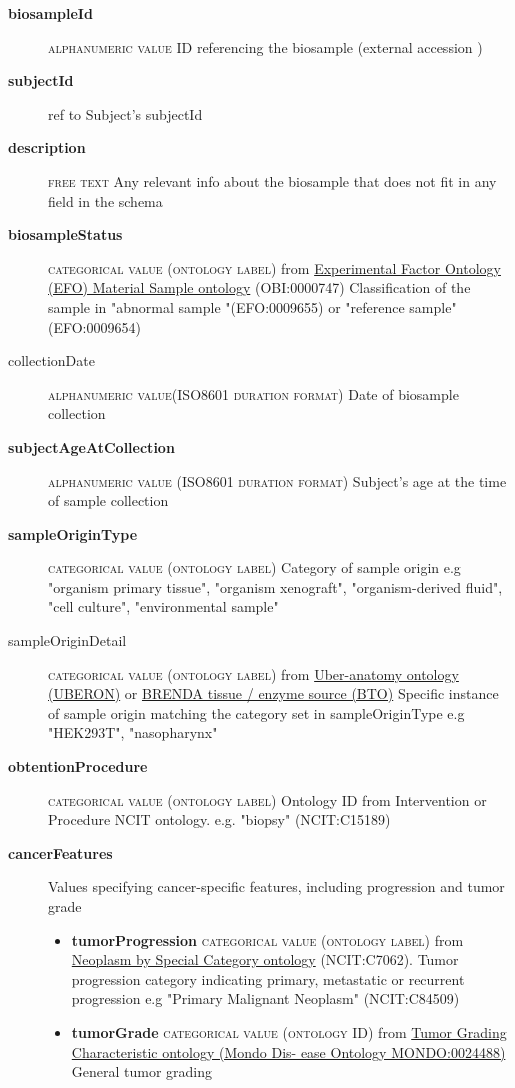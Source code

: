 \documentclass[a4paper, 10pt]{article}        %
\begin{document}
  \begin{description}
	\item[\textbf{biosampleId}]  {\textsc{alphanumeric value}} ID referencing the biosample (external accession )
	\item[\textbf{subjectId}] ref to Subject's subjectId
	\item[\textbf{description}]  {\textsc{free text}} Any relevant info about the biosample that does not fit in any field in the schema
	\item[\textbf{biosampleStatus}] {\textsc{categorical value (ontology label)}} from  \href{link}{Experimental Factor Ontology (EFO) Material Sample ontology} (OBI:0000747) Classification of the sample in "abnormal sample "(EFO:0009655) or "reference sample" (EFO:0009654)
	\item[collectionDate] {\textsc{alphanumeric value(ISO8601 duration format)}} Date of biosample collection
	\item[\textbf{subjectAgeAtCollection}] {\textsc{alphanumeric value (ISO8601 duration format)}} Subject's age at  the time of sample collection
	\item[\textbf{sampleOriginType}] {\textsc{categorical value (ontology label)}} Category of sample origin e.g "organism primary tissue", "organism xenograft", "organism-derived fluid", "cell culture", "environmental sample"
	\item[sampleOriginDetail] {\textsc{categorical value (ontology label)}} from \href{link}{Uber-anatomy ontology (UBERON)} or \href{link}{BRENDA tissue / enzyme
source (BTO)} Specific instance of sample origin matching the category set in sampleOriginType e.g "HEK293T", "nasopharynx"
	\item[\textbf{obtentionProcedure}] {\textsc{categorical value (ontology label)}} Ontology ID from Intervention or Procedure NCIT ontology. e.g. "biopsy" (NCIT:C15189) %
	\item[\textbf{cancerFeatures}] Values specifying cancer-specific features, including progression and tumor grade
	\begin{itemize}
			\item[] \textbf{tumorProgression} {\textsc{categorical value (ontology label)}} from \href{link}{Neoplasm by Special Category ontology} (NCIT:C7062). Tumor progression category indicating primary, metastatic or recurrent progression  e.g "Primary Malignant Neoplasm" (NCIT:C84509)
			\item[] \textbf{tumorGrade} {\textsc{categorical value (ontology ID)}} from \href{link}{Tumor Grading Characteristic ontology (Mondo Dis- ease Ontology MONDO:0024488)} General tumor grading  	
\end{itemize} 
 \end{description}
 
\end{document}
